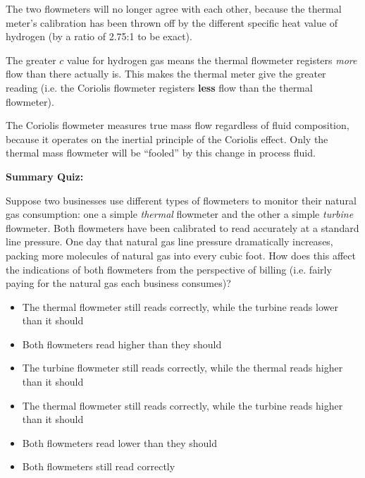 












The two flowmeters will no longer agree with each other, because the thermal meter's calibration has been thrown off by the different specific heat value of hydrogen (by a ratio of 2.75:1 to be exact).

\vskip 10pt

The greater $c$ value for hydrogen gas means the thermal flowmeter registers {\it more} flow than there actually is.  This makes the thermal meter give the greater reading (i.e. the Coriolis flowmeter registers {\bf less} flow than the thermal flowmeter).

\vskip 10pt

The Coriolis flowmeter measures true mass flow regardless of fluid composition, because it operates on the inertial principle of the Coriolis effect.  Only the thermal mass flowmeter will be ``fooled'' by this change in process fluid.









\vfil \eject

\noindent
{\bf Summary Quiz:}

Suppose two businesses use different types of flowmeters to monitor their natural gas consumption: one a simple {\it thermal} flowmeter and the other a simple {\it turbine} flowmeter.  Both flowmeters have been calibrated to read accurately at a standard line pressure.  One day that natural gas line pressure dramatically increases, packing more molecules of natural gas into every cubic foot.  How does this affect the indications of both flowmeters from the perspective of billing (i.e. fairly paying for the natural gas each business consumes)?

\begin{itemize}
\item{} The thermal flowmeter still reads correctly, while the turbine reads lower than it should
\vskip 5pt 
\item{} Both flowmeters read higher than they should 
\vskip 5pt 
\item{} The turbine flowmeter still reads correctly, while the thermal reads higher than it should 
\vskip 5pt 
\item{} The thermal flowmeter still reads correctly, while the turbine reads higher than it should 
\vskip 5pt 
\item{} Both flowmeters read lower than they should
\vskip 5pt 
\item{} Both flowmeters still read correctly
\end{itemize}




